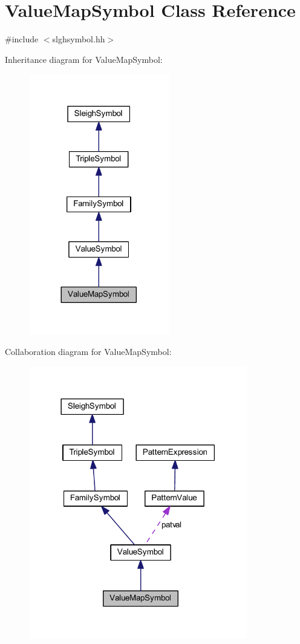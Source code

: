 \hypertarget{class_value_map_symbol}{}\section{Value\+Map\+Symbol Class Reference}
\label{class_value_map_symbol}


{\ttfamily \#include $<$slghsymbol.\+hh$>$}



Inheritance diagram for Value\+Map\+Symbol\+:
\nopagebreak
\begin{figure}[H]
\begin{center}
\leavevmode
\includegraphics[width=173pt]{class_value_map_symbol__inherit__graph}
\end{center}
\end{figure}


Collaboration diagram for Value\+Map\+Symbol\+:
\nopagebreak
\begin{figure}[H]
\begin{center}
\leavevmode
\includegraphics[width=270pt]{class_value_map_symbol__coll__graph}
\end{center}
\end{figure}
